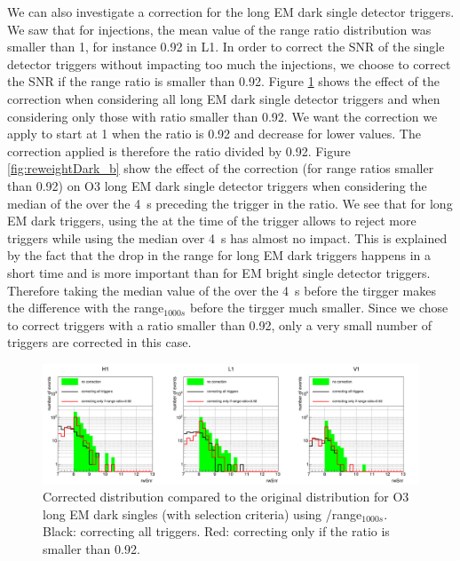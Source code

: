 We can also investigate a correction for the long EM dark single detector triggers.
We saw that for injections, the mean value of the range ratio distribution was smaller than 1, for instance 0.92 in L1.
In order to correct the SNR of the single detector triggers without impacting too much the injections, we choose to correct the SNR if the range ratio is smaller than 0.92.
Figure \ref{fig:reweightDarkInstant} shows the effect of the correction when considering all long EM dark single detector triggers and when considering only those with ratio smaller than 0.92.
We want the correction we apply to start at 1 when the ratio is 0.92 and decrease for lower values.
The correction applied is therefore the ratio divided by 0.92.
Figure \ref{fig:reweightDark_b} show the effect of the correction (for range ratios smaller than 0.92) on O3 long EM dark single detector triggers when considering the median of the \medr{} over the \SI{4}{s} preceding the trigger in the ratio.
We see that for long EM dark triggers, using the \medr{} at the time of the trigger allows to reject more triggers while using the median over \SI{4}{s} has almost no impact.
This is explained by the fact that the drop in the range for long EM dark triggers happens in a short time and is more important than for EM bright single detector triggers.
Therefore taking the median value of the \medr{} over the \SI{4}{s} before the tirgger makes the difference with the range$_{1000s}$ before the tirgger much smaller.
Since we chose to correct triggers with a ratio smaller than 0.92, only a very small number of triggers are corrected in this case.
\begin{figure}[H]
  \centering
  \includegraphics[width=\linewidth]{sectionBadTriggers/PSD/Reweight/cThese1_darkLong.png}
  \caption{Corrected distribution compared to the original distribution for O3 long EM dark singles (with selection criteria) using \medr{}/range$_{1000s}$. Black: correcting all triggers. Red: correcting only if the ratio is smaller than 0.92.}
  \label{fig:reweightDarkInstant}
\end{figure}
%
